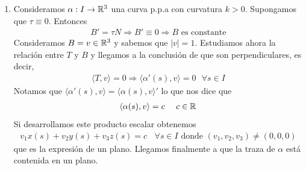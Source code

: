 \begin{ejercicio}
\begin{enumerate}
        \item[4\ bis.] Consideramos $\alpha :I\to \mathbb{R}^3$ una curva p.p.a con curvatura $k>0$. Supongamos que $\tau \equiv 0$. Entonces 
        \begin{gather*}
            B'=\tau N \Rightarrow B' \equiv 0 \Rightarrow B \text{ es constante}
        \end{gather*}
        Consideramos $B=v\in \mathbb{R}^3$ y sabemos que $|v|=1$. Estudiamos ahora la relación entre $T$ y $B$ y llegamos a la conclusión de que son perpendiculares, es decir,
        \begin{gather*}
            \langle T, v \rangle = 0 \Rightarrow \langle \alpha'(s), v \rangle = 0 \ \ \ \forall s \in I
        \end{gather*}
        Notamos que $\langle \alpha'(s), v \rangle = \langle \alpha(s), v \rangle'$ lo que nos dice que
        \begin{gather*}
            \langle \alpha(s), v \rangle = c \ \ \ \ c\in \mathbb{R}
        \end{gather*}
        Si desarrollamos este producto escalar obtenemos
        \begin{gather*}
            v_1x(s) + v_2y(s) + v_3z(s) = c \ \ \ \ \forall s\in I \text{ donde } (v_1,v_2,v_3)\neq (0,0,0)
        \end{gather*}
        que es la expresión de un plano. Llegamos finalmente a que la traza de $\alpha$ está contenida en un plano.


\end{enumerate}
\end{ejercicio}

